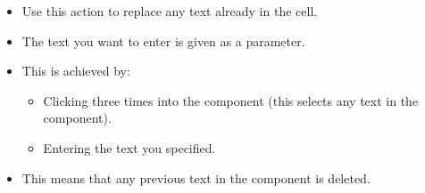 \begin{itemize}
\item Use this action to replace any text already in the cell.
\item The text you want to enter is given as a parameter.
\item This is achieved by:
\begin{itemize}
\item Clicking three times into the component (this selects any text in the component).
\item Entering the text you specified.
\end{itemize}
\item This means that any previous text in the component is deleted. 
\end{itemize}
